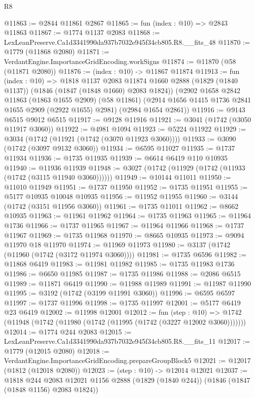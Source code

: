 \begin{lexlean}{R8}
\begin{coremodule}
@11863 := @2844 @11861 @2867
@11865 := fun (index : @10) => @2843 @11863
@11867 := @1774 @1137 @2083
@11868 := LexLeanPreserve.Ca1d3341990da937b7032e945f34cb805.R8.__fits_48
@11870 := @1779 (@11868 @2080)
@11871 := VerdantEngine.ImportanceGridEncoding.workSigns
@11874 := @11870 (@58 (@11871 @2080))
@11876 := (index : @10) -> @11867 @11874
@11913 := fun (index : @10) =>
  @1818
    @1137
    @2083
    @11874
    @1660
    @2888
    (@1829 (@1840 @1137))
    (@1846 (@1847 (@1848 @1660) @2083 @1824))
    (@2902
      @1658
      @2842
      @11863
      (@1863 @1655 @2909)
      (@58 @11861)
      (@2914 @1656 @1415 @1736 @2841 @1655 @2909 (@2922 @1655) @2981)
      (@2984 @1654 @2861))
@11916 := @9143 @6515 @9012 @6515
@11917 := @9128 @11916
@11921 := @3041 (@1742 (@3050 @11917 @3060))
@11922 := @4981 @1094
@11923 := @5224 @11922
@11929 := @3034 (@1742 (@11921 (@1742 (@3070 @11923 @3060))))
@11933 := @3090 (@1742 (@3097 @9132 @3060))
@11934 := @6595 @11027
@11935 := @1737 @11934
@11936 := @1735 @11935
@11939 := @6614 @6419 @110 @10935
@11940 := @11936 @11939
@11948 := @3027 (@1742 (@11929 (@1742 (@11933 (@1742 (@3115 @11940 @3060))))))
@11949 := @10144 @11011
@11950 := @11010 @11949
@11951 := @1737 @11950
@11952 := @1735 @11951
@11955 := @5177 @10935 @10048 @10935
@11956 := @11952 @11955
@11960 := @3144 (@1742 (@3151 @11956 @3060))
@11961 := @1735 @11011
@11962 := @8662 @10935
@11963 := @11961 @11962
@11964 := @1735 @11963
@11965 := @11964 @1736
@11966 := @1737 @11965
@11967 := @11964 @11966
@11968 := @1737 @11967
@11969 := @1735 @11968
@11970 := @8665 @10935
@11973 := @9094 @11970 @18 @11970
@11974 := @11969 @11973
@11980 := @3137 (@1742 (@11960 (@1742 (@3172 @11974 @3060))))
@11981 := @1735 @6596
@11982 := @11868 @6419
@11983 := @11981 @11982
@11985 := @1735 @11983 @1736
@11986 := @6650 @11985
@11987 := @1735 @11986
@11988 := @2086 @6515
@11989 := @11871 @6419
@11990 := @11988 @11989
@11991 := @11987 @11990
@11995 := @3192 (@1742 (@3199 @11991 @3060))
@11996 := @6595 @6597
@11997 := @1737 @11996
@11998 := @1735 @11997
@12001 := @5177 @6419 @23 @6419
@12002 := @11998 @12001
@12012 := fun (step : @10) =>
  @1742 (@11948 (@1742 (@11980 (@1742 (@11995 (@1742 (@3227 @12002 @3060)))))))
@12014 := @1774 @244 @2083
@12015 := LexLeanPreserve.Ca1d3341990da937b7032e945f34cb805.R8.__fits_11
@12017 := @1779 (@12015 @2080)
@12018 := VerdantEngine.ImportanceGridEncoding.prepareGroupBlock5
@12021 := @12017 (@1812 (@12018 @2080))
@12023 := (step : @10) -> @12014 @12021
@12037 := @1818
    @244
    @2083
    @12021
    @1156
    @2888
    (@1829 (@1840 @244))
    (@1846 (@1847 (@1848 @1156) @2083 @1824))

\end{coremodule}
\end{lexlean}

